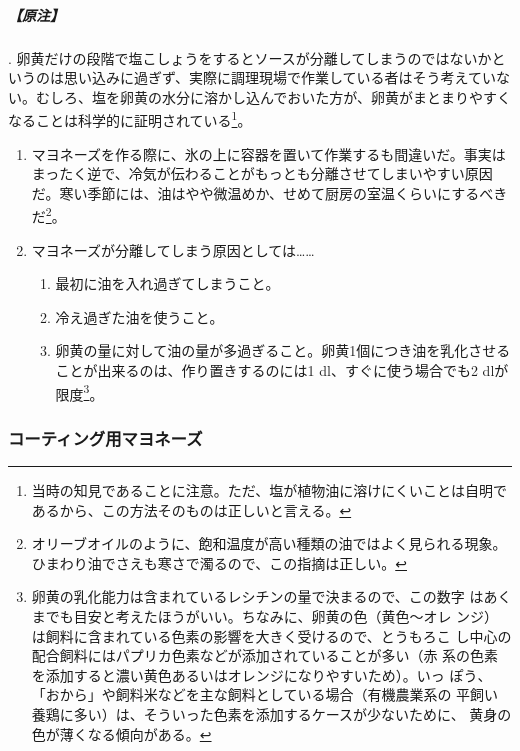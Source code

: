 \begin{recette}
\hypertarget{ux539fux6ce8-2}{%
\subparagraph{【原注】}\label{ux539fux6ce8-2}}

.
卵黄だけの段階で塩こしょうをするとソースが分離してしまうのではないかというのは思い込みに過ぎず、実際に調理現場で作業している者はそう考えていない。むしろ、塩を卵黄の水分に溶かし込んでおいた方が、卵黄がまとまりやすくなることは科学的に証明されている\footnote{当時の知見であることに注意。ただ、塩が植物油に溶けにくいことは自明であるから、この方法そのものは正しいと言える。}。

\begin{enumerate}
\def\labelenumi{\arabic{enumi}.}
\setcounter{enumi}{1}
\item
  マヨネーズを作る際に、氷の上に容器を置いて作業するも間違いだ。事実はまったく逆で、冷気が伝わることがもっとも分離させてしまいやすい原因だ。寒い季節には、油はやや微温めか、せめて厨房の室温くらいにするべきだ\footnote{オリーブオイルのように、飽和温度が高い種類の油ではよく見られる現象。ひまわり油でさえも寒さで濁るので、この指摘は正しい。}。
\item
  マヨネーズが分離してしまう原因としては\ldots{}\ldots{}

  \begin{enumerate}
  \def\labelenumii{\arabic{enumii}.}
  \item
    最初に油を入れ過ぎてしまうこと。
  \item
    冷え過ぎた油を使うこと。
  \item
    卵黄の量に対して油の量が多過ぎること。卵黄1個につき油を乳化させることが出来るのは、作り置きするのには1\troisquarts{}
    dl、すぐに使う場合でも2 dlが限度\footnote{卵黄の乳化能力は含まれているレシチンの量で決まるので、この数字
      はあくまでも目安と考えたほうがいい。ちなみに、卵黄の色（黄色〜オレ
      ンジ）は飼料に含まれている色素の影響を大きく受けるので、とうもろこ
      し中心の配合飼料にはパプリカ色素などが添加されていることが多い（赤
      系の色素を添加すると濃い黄色あるいはオレンジになりやすいため）。いっ
      ぽう、「おから」や飼料米などを主な飼料としている場合（有機農業系の
      平飼い養鶏に多い）は、そういった色素を添加するケースが少ないために、
      黄身の色が薄くなる傾向がある。}。
  \end{enumerate}
\end{enumerate}

\maeaki

\hypertarget{ux30b3ux30fcux30c6ux30a3ux30f3ux30b0ux7528ux30deux30e8ux30cdux30fcux30ba}{%
\subsubsection{コーティング用マヨネーズ}\label{ux30b3ux30fcux30c6ux30a3ux30f3ux30b0ux7528ux30deux30e8ux30cdux30fcux30ba}}


\end{recette}
